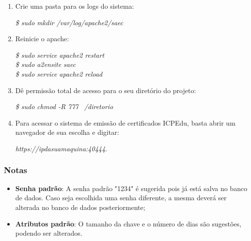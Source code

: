 \begin{enumerate}
    \item Crie uma pasta para os logs do sistema:
    
    \textit{\$ sudo mkdir /var/log/apache2/saec}
    
    \item Reinicie o apache:
    
    \textit{\$ sudo service apache2 restart}\\
    \textit{\$ sudo a2ensite saec}\\
    \textit{\$ sudo service apache2 reload}
    
    \item Dê permissão total de acesso para o seu diretório do projeto:
    
    \textit{\$ sudo chmod -R 777 ~/diretorio}
    
  \item Para acessar o sistema de emissão de certificados ICPEdu, basta abrir um navegador de sua escolha e digitar: 
  
  \textit{https://ipdasuamaquina:40444}.
\end{enumerate}
    \subsubsection{Notas}
    
    \begin{itemize}
  \item \textbf{Senha padrão}: A senha padrão "1234" é sugerida pois já está salva no banco de dados. Caso seja escolhida uma senha diferente, a mesma deverá ser alterada no banco de dados posteriormente;
  \item \textbf{Atributos padrão}: O tamanho da chave e o número de dias são sugestões, podendo ser alterados.
\end{itemize}
    